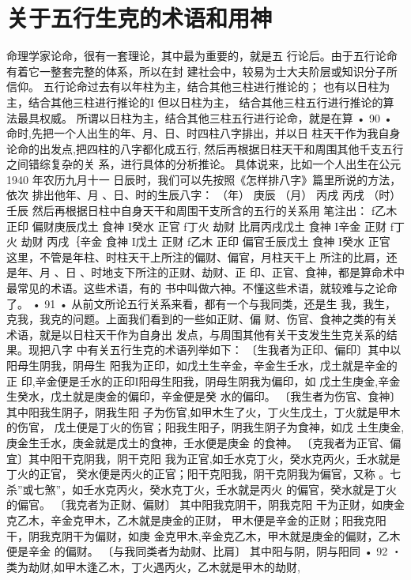 \section{关于五行生克的术语和用神}
命理学家论命，很有一套理论，其中最为重要的，就是五
行论后。由于五行论命有着它一整套完整的体系，所以在封
建社会中，较易为士大夫阶层或知识分子所信仰。
五行论命过去有以年柱为主，结合其他三柱进行推论的；
也有以日柱为主，结合其他三柱进行推论的I 但以日柱为主，
结合其他三柱五行进行推论的算法最具权威。
所谓以日柱为主，结合其他三柱五行进行论命，就是在算
• 90 •
命时,先把一个人出生的年、月、日、时四柱八字排出，并以日
柱天干作为我自身论命的出发点,把四柱的八字都化成五行,
然后再根据日柱天干和周围其他千支五行之间错综复杂的关
系，进行具体的分析推论。
具体说来，比如一个人出生在公元 1940 年农历九月十一
日辰时，我们可以先按照《怎样排八字》篇里所说的方法，依次
排出他年、月 、日、时的生辰八字：
（年） 庚辰
（月） 丙戌
丙戌
（时） 壬辰
然后再根据日柱中自身天干和周围干支所含的五行的关系用
笔注出：
f乙木 正印
偏财庚辰戊土 食神
I癸水 正官
f丁火 劫财
比肩丙戌戊土 食神
I辛金 正财
f丁火 劫财
丙戌｛辛金 食神
I戊土 正财
f乙木 正印
偏官壬辰戊土 食神
I癸水 正官
这里，不管是年柱、时柱天干上所注的偏财、偏官，月柱天干上
所注的比肩，还是年、月 、日 、时地支下所注的正财、劫财、正
印、正官、食神，都是算命术中最常见的术语。这些术语，有的
书中叫做六神。不懂这些术语，就较难与之论命了。
• 91 •
从前文所论五行关系来看，都有一个与我同类，还是生
我，我生，克我，我克的问题。上面我们看到的一些如正财、偏
财、伤官、食神之类的有关术语，就是以日柱天干作为自身出
发点，与周围其他有关干支发生生克关系的结果。现把八字
中有关五行生克的术语列举如下：
〔生我者为正印、偏印〕其中以阳母生阴我，阴母生
阳我为正印，如戊土生辛金，辛金生壬水，戊土就是辛金的正
印,辛金便是壬水的正印I阳母生阳我，阴母生阴我为偏印，如
戊土生庚金,辛金生癸水，戊土就是庚金的偏印，辛金便是癸
水的偏印。
〔我生者为伤官、食神〕 其中阳我生阴子，阴我生阳
子为伤官,如甲木生了火，丁火生戊土，丁火就是甲木的伤官，
戊土便是丁火的伤官；阳我生阳子，阴我生阴子为食神，如戊
土生庚金,庚金生壬水，庚金就是戊土的食神，壬水便是庚金
的食神。
〔克我者为正官、偏宜〕其中阳干克阴我，阴干克阳
我为正官,如壬水克丁火，癸水克丙火，壬水就是丁火的正官，
癸水便是丙火的正官；阳干克阳我，阴干克阴我为偏官，又称
。七杀”或七煞”，如壬水克丙火，癸水克丁火，壬水就是丙火
的偏官，癸水就是丁火的偏官。
〔我克者为正财、偏财〕 其中阳我克阴干，阴我克阳
干为正财，如庚金克乙木，辛金克甲木，乙木就是庚金的正财，
甲木便是辛金的正财；阳我克阳干，阴我克阴干为偏财，如庚
金克甲木,辛金克乙木，甲木就是庚金的偏财，乙木便是辛金
的偏财。
〔与我同类者为劫财、比肩〕 其中阳与阴，阴与阳同
• 92 ・
类为劫财,如甲木逢乙木，丁火遇丙火，乙木就是甲木的劫财,
